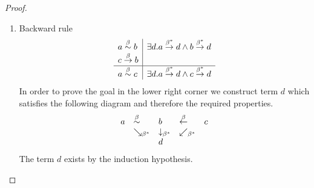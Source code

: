 \begin{theorem}
\begin{proof}
\begin{enumerate}
            \item Backward rule
            $$
            \begin{array}{l|l}
                a \stackrel{\beta}{\sim} b
                &
                \exists d. a \stackrel{\beta^*}{\to} d \land b \stackrel{\beta^*}{\to} d
                \\
                c \stackrel{\beta}{\to} b
                \\
                \hline
                a \stackrel{\beta}{\sim} c
                &
                \exists d. a \stackrel{\beta^*}{\to} d \land c \stackrel{\beta^*}{\to} d
            \end{array}
            $$
            In order to prove the goal in the lower right corner we construct
            term $d$ which satisfies the following diagram and therefore the
            required properties.
            $$
            \begin{array}{lllll}
                a
                &\stackrel{\beta}{\sim}
                &b
                &\stackrel{\beta}{\leftarrow}
                &c
                \\
                &\searrow_{\beta^*}
                &\downarrow_{\beta^*}
                &\swarrow_{\beta^*}
                \\
                &
                &d
            \end{array}
            $$
            The term $d$ exists by the induction hypothesis.
        \end{enumerate}
    \end{proof}
\end{theorem}
